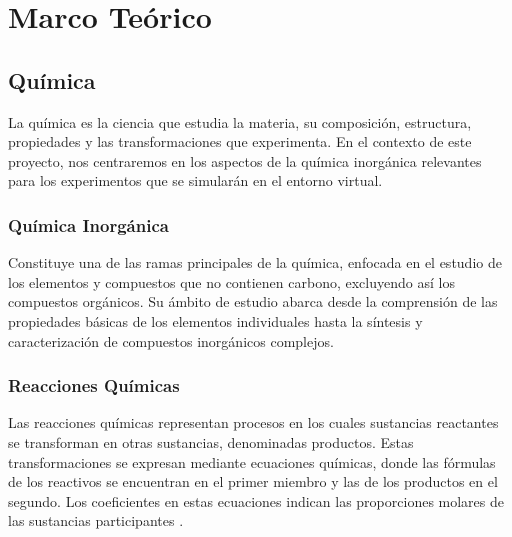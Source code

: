\chapter{Marco Teórico}\label{ch:Marco_Teórico}

\section{Química}
La química es la ciencia que estudia la materia, su composición, estructura, propiedades y las transformaciones que experimenta. En el contexto de este proyecto, nos centraremos en los aspectos de la química inorgánica relevantes para los experimentos que se simularán en el entorno virtual. 

\subsection{Química Inorgánica}

Constituye una de las ramas principales de la química, enfocada en el estudio de los elementos y compuestos que no contienen carbono, excluyendo así los compuestos orgánicos. Su ámbito de estudio abarca desde la comprensión de las propiedades básicas de los elementos individuales hasta la síntesis y caracterización de compuestos inorgánicos complejos.

\subsection{Reacciones Químicas}
Las reacciones químicas representan procesos en los cuales sustancias reactantes se transforman en otras sustancias, denominadas productos. Estas transformaciones se expresan mediante ecuaciones químicas, donde las fórmulas de los reactivos se encuentran en el primer miembro y las de los productos en el segundo. Los coeficientes en estas ecuaciones indican las proporciones molares de las sustancias participantes \cite{alfa_nauta}.

